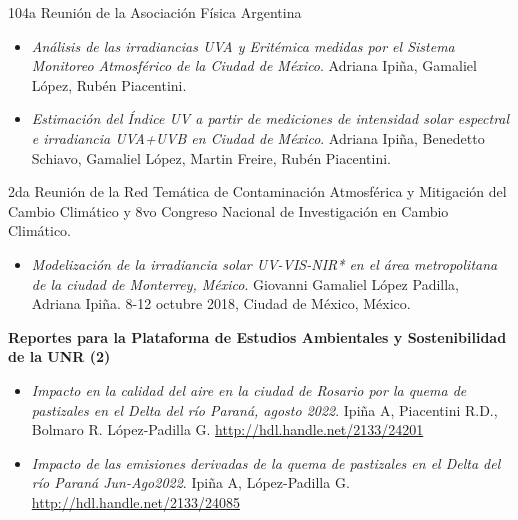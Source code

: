 \documentclass[12pt,letterpaper]{article}
\begin{document}
104a Reunión de la Asociación Física Argentina
\begin{itemize}[label={}]
    \item \textit{Análisis de las irradiancias UVA y Eritémica medidas por el Sistema Monitoreo Atmosférico de la Ciudad de México}. Adriana Ipiña, Gamaliel López, Rubén Piacentini.
    \item \textit{Estimación del Índice UV a partir de mediciones de intensidad solar espectral e irradiancia UVA+UVB en Ciudad de México}. Adriana Ipiña, Benedetto Schiavo, Gamaliel López, Martin Freire, Rubén Piacentini.
\end{itemize}

2da Reunión de la Red Temática de Contaminación Atmosférica y Mitigación del Cambio Climático y 8vo Congreso Nacional de Investigación en Cambio Climático.
\begin{itemize}[label={}]
    \item \textit{Modelización de la irradiancia solar UV-VIS-NIR* en el área metropolitana de la ciudad de Monterrey, México}. Giovanni Gamaliel López Padilla, Adriana Ipiña. 8-12 octubre 2018, Ciudad de México, México.
\end{itemize}

\textbf{Reportes para la Plataforma de Estudios Ambientales y Sostenibilidad  de la UNR (2)}
\begin{itemize}[label={}]
    \item \textit{Impacto en la calidad del aire en la ciudad de Rosario por la quema de pastizales en el Delta del río Paraná, agosto 2022}. Ipiña A, Piacentini R.D., Bolmaro R. López-Padilla G. \url{http://hdl.handle.net/2133/24201}
    \item \textit{Impacto de las emisiones derivadas de la quema de pastizales en el Delta del río Paraná Jun-Ago2022}. Ipiña A, López-Padilla G. \url{http://hdl.handle.net/2133/24085}
\end{itemize}
\end{document}
